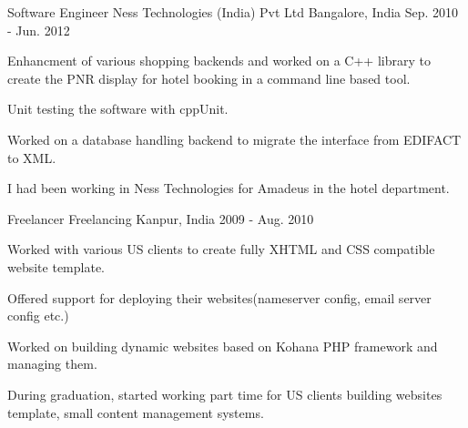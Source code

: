 \begin{cventries}
  \cventry
    {Software Engineer} %
    {Ness Technologies (India) Pvt Ltd} %
    {Bangalore, India} %
    {Sep. 2010 - Jun. 2012} %
    {
      \begin{cvitems} %
        \item {Enhancment of various shopping backends and worked on a C++ library to create the PNR display for hotel booking in a command line based tool.}
        \item {Unit testing the software with cppUnit.}
        \item {Worked on a database handling backend to migrate the interface from EDIFACT to XML.}
      \end{cvitems}
    }
    {
      \begin{cventrysummary}
        I had been working in Ness Technologies for Amadeus in the hotel department.
      \end{cventrysummary}
    }

  \cventry
    {Freelancer} %
    {Freelancing} %
    {Kanpur, India} %
    {2009 - Aug. 2010} %
    {
      \begin{cvitems} %
        \item {Worked with various US clients to create fully XHTML and CSS compatible website template.}
        \item {Offered support for deploying their websites(nameserver config, email server config etc.)}
        \item {Worked on building dynamic websites based on Kohana PHP framework and managing them.}
      \end{cvitems}
    }
    {
      \begin{cventrysummary}
        During graduation, started working part time for US clients building websites template, small content management systems.
      \end{cventrysummary}
    }
\end{cventries}
